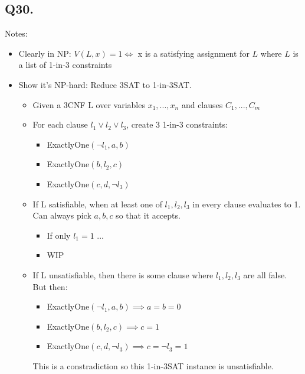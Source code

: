 \documentclass[letterpaper]{article}
\begin{document}
\subsection*{Q30.}
Notes:
\begin{itemize}
  \item Clearly in NP: $V(L,x) = 1 \iff $ x is a satisfying assignment for $L$ where $L$ is a list of 1-in-3 constraints
  \item Show it's NP-hard: Reduce 3SAT to 1-in-3SAT.
        \begin{itemize}
          \item Given a 3CNF L over variables $x_1,...,x_n$ and clauses $C_1,...,C_m$
          \item For each clause $l_1 \vee l_2 \vee l_3$, create 3 1-in-3 constraints:
                \begin{itemize}
                  \item ExactlyOne$(\neg l_1, a, b)$
                  \item ExactlyOne$(b, l_2, c)$
                  \item ExactlyOne$(c, d, \neg l_3)$
                \end{itemize}
          \item If L satisfiable, when at least one of $l_1, l_2, l_3$ in every clause
                evaluates to 1. Can always pick $a,b,c$ so that it accepts.
                \begin{itemize}
                  \item If only $l_1 = 1$ ...
                  \item WIP
                \end{itemize}
          \item If L unsatisfiable, then there is some clause where $l_1, l_2, l_3$
                are all false. But then:
                \begin{itemize}
                  \item ExactlyOne$(\neg l_1, a, b) \implies a = b = 0$
                  \item ExactlyOne$(b, l_2, c) \implies c = 1$
                  \item ExactlyOne$(c, d, \neg l_3) \implies c = \neg l_3 = 1$
                \end{itemize}
                This is a constradiction so this 1-in-3SAT instance is unsatisfiable.
        \end{itemize}
\end{itemize}
\end{document}

